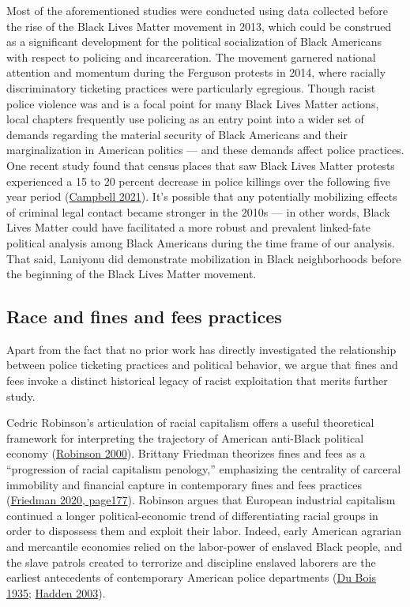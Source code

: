 \documentclass[
  12pt,
]{article}
\begin{document}
Most of the aforementioned studies were conducted using data collected before the rise of the Black Lives Matter movement in 2013, which could be construed as a significant development for the political socialization of Black Americans with respect to policing and incarceration. The movement garnered national attention and momentum during the Ferguson protests in 2014, where racially discriminatory ticketing practices were particularly egregious. Though racist police violence was and is a focal point for many Black Lives Matter actions, local chapters frequently use policing as an entry point into a wider set of demands regarding the material security of Black Americans and their marginalization in American politics --- and these demands affect police practices. One recent study found that census places that saw Black Lives Matter protests experienced a 15 to 20 percent decrease in police killings over the following five year period (\protect\hyperlink{ref-Campbell2021}{Campbell 2021}). It's possible that any potentially mobilizing effects of criminal legal contact became stronger in the 2010s --- in other words, Black Lives Matter could have facilitated a more robust and prevalent linked-fate political analysis among Black Americans during the time frame of our analysis. That said, Laniyonu did demonstrate mobilization in Black neighborhoods before the beginning of the Black Lives Matter movement.

\hypertarget{race-and-fines-and-fees-practices}{%
\subsection*{Race and fines and fees practices}\label{race-and-fines-and-fees-practices}}

Apart from the fact that no prior work has directly investigated the relationship between police ticketing practices and political behavior, we argue that fines and fees invoke a distinct historical legacy of racist exploitation that merits further study.

Cedric Robinson's articulation of racial capitalism offers a useful theoretical framework for interpreting the trajectory of American anti-Black political economy (\protect\hyperlink{ref-Robinson2000}{Robinson 2000}). Brittany Friedman theorizes fines and fees as a ``progression of racial capitalism penology,'' emphasizing the centrality of carceral immobility and financial capture in contemporary fines and fees practices (\protect\hyperlink{ref-Friedman2020}{Friedman 2020, page177}). Robinson argues that European industrial capitalism continued a longer political-economic trend of differentiating racial groups in order to dispossess them and exploit their labor. Indeed, early American agrarian and mercantile economies relied on the labor-power of enslaved Black people, and the slave patrols created to terrorize and discipline enslaved laborers are the earliest antecedents of contemporary American police departments (\protect\hyperlink{ref-DuBois1935}{Du Bois 1935}; \protect\hyperlink{ref-Hadden2003}{Hadden 2003}).
\end{document}
